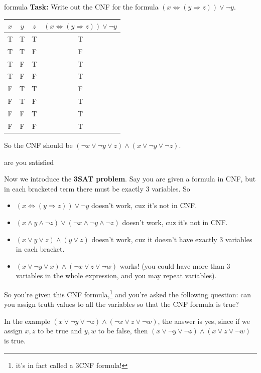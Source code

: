 \documentclass{beamer}
\begin{document}
\begin{frame}{formula}
\textbf{Task: } Write out the CNF for the formula $(x \Leftrightarrow (y \Rightarrow z)) \lor \neg y$.
\begin{center}
\begin{tabular}{|c|c|c|c|}
\hline
$x$ & $y$ & $z$ & $(x \Leftrightarrow (y \Rightarrow z)) \lor \neg y$\\
\hline
T & T & T & T\\
\hline
T & T & F & F\\
\hline
T & F & T & T\\
\hline
T & F & F & T\\
\hline
F & T & T & F\\
\hline
F & T & F & T\\
\hline
F & F & T & T\\
\hline
F & F & F & T\\
\hline
\end{tabular}
\end{center}
So the CNF should be $(\neg x \lor \neg y \lor z) \land (x \lor \neg y \lor \neg z)$.
\end{frame}

\begin{frame}{are you satisfied \emojiflushed}

Now we introduce the \textbf{3SAT problem}. Say you are given a formula in CNF, but in each bracketed term there must be exactly 3 variables. So
\begin{itemize}
\item $(x \Leftrightarrow (y \Rightarrow z)) \lor \neg y$ doesn't work, cuz it's not in CNF.
\item $(x \land y \land \neg z) \lor (\neg x \land \neg y \land \neg z)$ doesn't work, cuz it's not in CNF.
\item $(x \lor y \lor z) \land (y \lor z)$ doesn't work, cuz it doesn't have exactly 3 variables in each bracket.
\item $(x \lor \neg y \lor x) \land (\neg x \lor z \lor \neg w)$ works! (you could have more than 3 variables in the whole expression, and you may repeat variables).
\end{itemize}

So you're given this CNF formula,\footnote{it's in fact called a 3CNF formula!} and you're asked the following question: can you assign truth values to all the variables so that the CNF formula is true? 

\vspace{2mm}

In the example $(x \lor \neg y \lor \neg z) \land (\neg x \lor z \lor \neg w)$, the answer is yes, since if we assign $x, z$ to be true and $y, w$ to be false, then
$(x \lor \neg y \lor \neg z) \land (x \lor z \lor \neg w)$ is true.
\end{frame}
\end{document}
